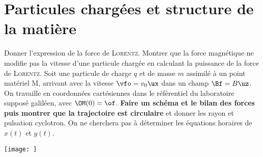 \documentclass[a4paper, 10pt, final, garamond]{book}
\begin{document}
\setcounter{chapter}{17}


\chapter{Particules chargées et structure de la matière}

\begin{enumerate}[label=\sqenumi]
	Donner l'expression de la force de \textsc{Lorentz}. Montrer que la force
	magnétique ne modifie pas la vitesse d'une particule chargée en calculant la
	puissance de la force de \textsc{Lorentz}.
	\smallbreak
	\vspace{-15pt}
	\psw{
		\[
			\Ff \stm{=} q \left( \Ef + \vf \wedge \Bf \right)
			\Ra
			\Pc(\Ff) = q \left( \Ef + \vf \wedge \Bf \right)\cdot \vf
			= q\Ef\cdot\vf +
			q\underbracket[1pt]{\underbracket[1pt]{\vf\wedge\Bf}_{\perp\vf}\cdot\vf}_{=0}
			\Lra
			\boxed{\Pc(\Ff) \stm[-1]{=} q\Ef\cdot\vf} \stm{=} \dv{\Ec_c}{t}
		\]
	}
	\vspace{-15pt}
	Soit une particule de charge $q$ et de masse $m$ assimilé à un point matériel
	M, arrivant avec la vitesse $\vfo = v_0\ux$ dans un champ $\Bf = B\uz$. On
	travaille en coordonnées cartésiennes dans le référentiel du laboratoire
	supposé galiléen, avec $\OM(0) = \of$. \textbf{Faire un schéma et le bilan des
		forces puis montrer que la trajectoire est circulaire} et donner les rayon et
	pulsation cyclotron. On ne cherchera pas à déterminer les équations horaires
	de $x(t)$ et $y(t)$.
	\smallbreak
	\vspace{-15pt}
	\begin{isd}
		\begin{center}
			\texttt{[image: ]}
		\end{center}
		\psw{
			\[
				\begin{array}{ll}
					\textbf{Poids}            & \text{négligeable \textbf{devant }}\Ff \\
					\textbf{Force magnétique} & \Ff = q\vf\wedge\Bf =
					\mqty(q\xp                                                         \\q\yp\\q\zp)\wedge\mqty(0\\0\\B)\\
					\Lra                      & \Ff = q\yp B\ux -q\xp B\uy

\end{array}\]}
\end{isd}
\end{enumerate}
\end{document}
